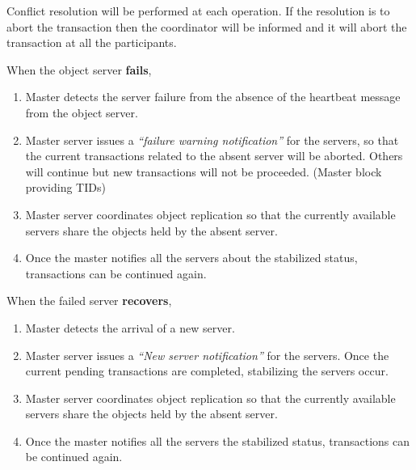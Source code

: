 \documentclass[times, 10pt,twocolumn]{article}
\begin{document}
Conflict resolution will be performed at each operation. If the resolution is to abort the transaction then the coordinator will be informed and it will abort the transaction at all the participants.

\label{subsec:faultol}

When the object server {\bf fails},
\begin{enumerate}
\item Master detects the server failure from the absence of the heartbeat message from the object server.
\item Master server issues a {\it “failure warning notification”} for the servers, so that the current transactions related to the absent server will be aborted.
Others will continue but new transactions will not be proceeded. (Master block providing TIDs)
\item Master server coordinates object replication so that the currently available servers share the objects held by the absent server.
\item Once the master notifies all the servers about the stabilized status, transactions can be continued again.
\end{enumerate}

When the failed server {\bf recovers},
\begin{enumerate}
\item Master detects the arrival of a new server.
\item Master server issues a {\it “New server notification”} for the servers. Once the current pending transactions are completed, stabilizing the servers occur.
\item Master server coordinates object replication so that the currently available servers share the objects held by the absent server.
\item Once the master notifies all the servers the stabilized status, transactions can be continued again.
\end{enumerate}


\end{document}
